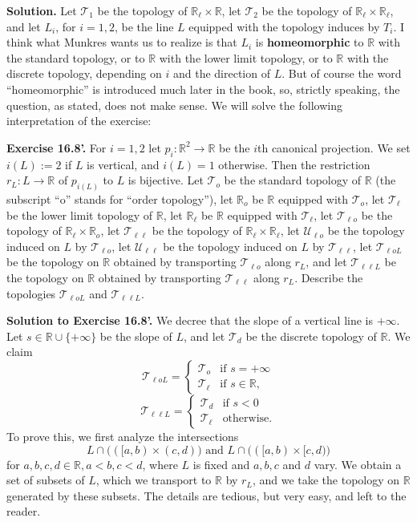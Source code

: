 \documentclass[12pt,letterpaper]{article}
\newcommand{\mc}{\mathcal}
\newcommand{\noi}{\noindent}%
\newcommand{\R}{\mathbb R}
\newcommand{\T}{\mathcal T}
\begin{document}
\noi\textbf{Solution.} Let $\T_1$ be the topology of $\R_\ell\times\R$, let $\T_2$ be the topology of $\R_\ell\times\R_\ell$, and let $L_i$, for $i=1,2$, be the line $L$ equipped with the topology induces by $T_i$. I think what Munkres wants us to realize is that $L_i$ is \textbf{homeomorphic} to $\R$ with the standard topology, or to $\R$ with the lower limit topology, or to $\R$ with the discrete topology, depending on $i$ and the direction of $L$. But of course the word ``homeomorphic'' is introduced much later in the book, so, strictly speaking, the question, as stated, does not make sense. We will solve the following interpretation of the exercise: 

\noi\textbf{Exercise 16.8'.} For $i=1,2$ let $p_i:\R^2\to\R$ be the $i$th canonical projection. We set $i(L):=2$ if $L$ is vertical, and $i(L)=1$ otherwise. Then the restriction $r_L:L\to\R$ of $p_{i(L)}$ to $L$ is bijective. Let $\T_o$ be the standard topology of $\R$ (the subscript ``o'' stands for ``order topology''), let $\R_o$ be $\R$ equipped with $\T_o$, let $\T_\ell$ be the lower limit topology of $\R$, let $\R_\ell$ be $\R$ equipped with $\T_\ell$, let $\T_{\ell o}$ be the topology of $\R_\ell\times\R_o$, let $\T_{\ell\ell}$ be the topology of $\R_\ell\times\R_\ell$, let $\mc U_{\ell o}$ be the topology induced on $L$ by $\T_{\ell o}$, let $\mc U_{\ell\ell}$ be the topology induced on $L$ by $\T_{\ell\ell}$, let $\T_{\ell oL}$ be the topology on $\R$ obtained by transporting $\T_{\ell o}$ along $r_L$, and let $\T_{\ell\ell L}$ be the topology on $\R$ obtained by transporting $\T_{\ell\ell}$ along $r_L$. Describe the topologies $\T_{\ell oL}$ and $\T_{\ell\ell L}$. 

\noi\textbf{Solution to Exercise 16.8'.} We decree that the slope of a vertical line is $+\infty$. Let $s\in\R\cup\{+\infty\}$ be the slope of $L$, and let $\T_d$ be the discrete topology of $\R$. We claim 
$$
\T_{\ell oL}=
\begin{cases}
\T_o&\text{if }s=+\infty\\ 
\T_\ell&\text{if }s\in\R,
\end{cases}
$$ 
$$
\T_{\ell\ell L}=
\begin{cases}
\T_d&\text{if }s<0\\ 
\T_\ell&\text{otherwise.}
\end{cases}
$$ 
To prove this, we first analyze the intersections 
$$
L\cap\big(([a,b)\times(c,d)\big)\text{ and }L\cap\big(([a,b)\times[c,d)\big)
$$ 
for $a,b,c,d\in\R,a<b,c<d$, where $L$ is fixed and $a,b,c$ and $d$ vary. We obtain a set of subsets of $L$, which we transport to $\R$ by $r_L$, and we take the topology on $\R$ generated by these subsets. The details are tedious, but very easy, and left to the reader. 
\end{document}

